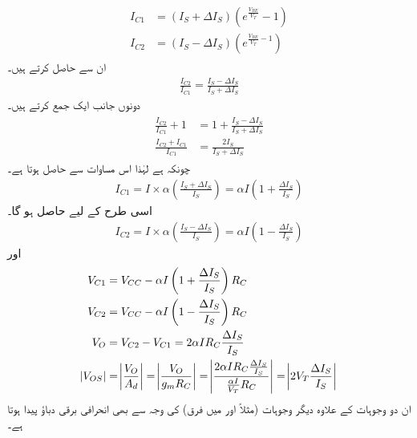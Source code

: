 \begin{gather}
\begin{aligned}
I_{C1}&=\left(I_S + \Delta I_S \right ) \left (e^{\frac{V_{BE}}{V_T}} -1\right )\\
I_{C2}&=\left(I_S - \Delta I_S \right ) \left (e^{\frac{V_{BE}}{V_T}-1} \right )
\end{aligned}
\end{gather}
ان سے  حاصل کرتے ہیں۔
\begin{align}
\frac{I_{C2}}{I_{C1}}=\frac{I_S-\Delta I_S}{I_S + \Delta I_S}
\end{align}
دونوں جانب ایک   جمع کرتے ہیں۔
\begin{gather}
\begin{aligned}
\frac{I_{C2}}{I_{C1}}+1 &=1+\frac{I_S - \Delta I_S}{I_S + \Delta I_S}\\
\frac{I_{C2}+I_{C1}}{I_{C1}}&=\frac{2 I_S}{I_S + \Delta I_S}
\end{aligned}
\end{gather}
چونکہ   ہے لہٰذا اس مساوات سے حاصل ہوتا ہے۔
\begin{align}
I_{C1}= I \times \alpha \left(\frac{I_S + \Delta I_S}{I_S} \right )=\alpha I \left (1+\frac{\Delta I_S}{I_S} \right )
\end{align}
اسی طرح   کے لیے حاصل ہو گا۔
\begin{align}
I_{C2}=I \times \alpha \left(\frac{I_S - \Delta I_S}{I_S} \right )=\alpha I \left (1-\frac{\Delta I_S}{I_S} \right )
\end{align}
اور
\begin{gather}
\begin{aligned}
V_{C1}&=V_{CC}-\alpha I \left(1+\frac{\Delta I_S}{I_S} \right ) R_C\\
V_{C2}&=V_{CC}-\alpha I \left(1- \frac{\Delta I_S}{I_S} \right ) R_C\\
V_O&=V_{C2}-V_{C1}=2 \alpha I R_C \frac{\Delta I_S}{I_S}\\
\abs{V_{OS}}&=\abs{\frac{V_{O}}{A_d}}=\abs{\frac{V_O}{g_m R_C}}=\abs{\frac{2 \alpha I R_C \frac{\Delta I_S}{I_S}}{\frac{\alpha I}{V_T} R_C}}=\abs{2 V_T \frac{\Delta I_S}{I_S}}
\end{aligned}
\end{gather}
ان دو وجوہات کے علاوہ دیگر وجوہات (مثلاً   اور  میں فرق) کی وجہ سے بھی انحرافی برقی دباؤ پیدا ہوتا ہے۔

